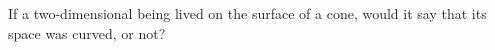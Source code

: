 If a two-dimensional being lived on the surface of a cone, would it say that its space was curved, or not?
